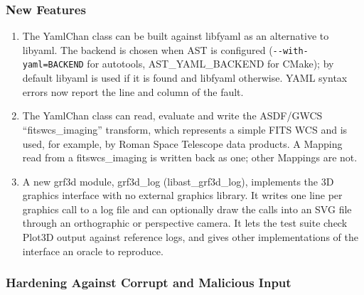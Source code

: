 \documentclass[twoside,11pt]{starlink}
\begin{document}
\subsubsection{New Features}

\begin{enumerate}
\item The YamlChan class can be built against libfyaml as an alternative to libyaml.
  The backend is chosen when AST is configured (\texttt{-{}-with-yaml=BACKEND} for autotools, AST\_YAML\_BACKEND for CMake); by default libyaml is used if it is found and libfyaml otherwise.
  YAML syntax errors now report the line and column of the fault.
\item The YamlChan class can read, evaluate and write the ASDF/GWCS ``fitswcs\_imaging'' transform, which represents a simple FITS WCS and is used, for example, by Roman Space Telescope data products.
  A Mapping read from a fitswcs\_imaging is written back as one; other Mappings are not.
\item A new grf3d module, grf3d\_log (libast\_grf3d\_log), implements the 3D graphics interface with no external graphics library.
  It writes one line per graphics call to a log file and can optionally draw the calls into an SVG file through an orthographic or perspective camera.
  It lets the test suite check Plot3D output against reference logs, and gives other implementations of the interface an oracle to reproduce.
\end{enumerate}

\subsubsection{Hardening Against Corrupt and Malicious Input}
\end{document}
